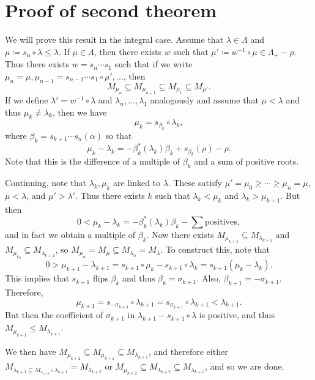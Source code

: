 \documentclass[leqno, openany]{memoir}
\theoremstyle{definition}
\theoremstyle{remark}
\theoremstyle{plain}
\theoremstyle{definition}
\theoremstyle{remark}
\begin{document}
\section{Proof of second theorem}%
\label{sec:proof_of_second_theorem}

We will prove this result in the integral case. Assume that $\lambda \in \Lambda$ and $\mu \coloneqq s_{\alpha} \circ \lambda \leq \lambda$. If $\mu \in \Lambda$, then there exists $w$ such that $\mu' \coloneqq w^{-1} \circ \mu \in \Lambda_+ - \rho$. Thus there exists $w = s_n \cdots s_1$ such that if we write $\mu_n = \mu, \mu_{n-1} = s_{n-1} \cdots s_1 \circ \mu', \ldots$, then 
\[ M_{\mu_n} \subseteq M_{\mu_{n-1}} \subseteq M_{\mu_1} \subseteq M_{\mu'}. \]
If we define $\lambda' = w^{-1} \circ \lambda$ and $\lambda_n, \ldots, \lambda_1$ analogously and assume that $\mu< \lambda$ and thus $\mu_k \neq \lambda_k$, then we have
\[ \mu_k = s_{\beta_k} \circ \lambda_k, \]
where $\beta_k = s_{k+1} \cdots s_n (\alpha)$ so that 
\[ \mu_k - \lambda_k = -\beta_k^*(\lambda_k) \beta_k + s_{\beta_k}(\rho) - \rho. \]
Note that this is the difference of a multiple of $\beta_k$ and a sum of positive roots.

Continuing, note that $\lambda_k, \mu_k$ are linked to $\lambda$. These satisfy $\mu' = \mu_0 \geq \cdots \geq \mu_n = \mu$, $\mu < \lambda$, and $\mu' > \lambda'$. Thus there exists $k$ such that $\lambda_k < \mu_k$ and $\lambda_k > \mu_{k+1}$. But then
\[ 0 < \mu_k - \lambda_k = -\beta_k^*(\lambda_k) \beta_k - \sum \text{positives}, \]
and in fact we obtain a multiple of $\beta_k$. Now there exists $M_{\mu_{k+1}} \subseteq M_{\lambda_{k+1}}$ and $M_{\mu_{k_2}} \subseteq M_{\lambda_{k+2}}$, so $M_{\mu_n} = M_{\mu} \subseteq M_{\lambda_n} = M_{\lambda}$. To construct this, note that 
\[ 0 > \mu_{k+1} - \lambda_{k+1} = s_{k+1} \circ \mu_k - s_{k+1} \circ \lambda_k = s_{k+1}(\mu_k - \lambda_k). \]
This implies that $s_{k+1}$ flips $\beta_k$ and thus $\beta_k = \sigma_{k+1}$. Also, $\beta_{k+1} = - \sigma_{k+1}$. Therefore, 
\[ \mu_{k+1} = s_{-\sigma_{k+1}} \circ \lambda_{k+1} = s_{\sigma_{k+1}} \circ \lambda_{k+1} < \lambda_{k+1}. \]
But then the coefficient of $\sigma_{k+1}$ in $\lambda_{k+1} - s_{k+1} \circ \lambda$ is positive, and thus $M_{\mu_{k+1}} \leq M_{\lambda_{k+1}}$.

We then have $M_{\mu_{k+2}} \subseteq M_{\mu_{k+1}} \subseteq M_{\lambda_{k+1}}$, and therefore either $M_{\lambda_{k+1} \subseteq M_{s_{k+2}} \circ \lambda_{k+1}} = M_{\lambda_{k+2}}$ or $M_{\mu_{k+2}} \subseteq M_{\lambda_{k+2}} \subseteq M_{\lambda_{k+1}}$, and so we are done.
\end{document}
